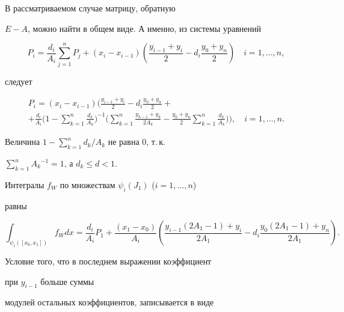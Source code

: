 \begin{pf}


В рассматриваемом случае матрицу, обратную


$E-A$, можно найти в общем виде. А именно, из системы уравнений


$$


P_i = \frac{d_i}{A_i} \sum_{j=1}^n P_j + (x_i-x_{i-1})


{\left({ \frac{y_{i-1}+y_i}{2} - d_i \frac{y_0+y_n}{2} } \right)}


\quad i=1, \dotsc , n ,


$$


следует


\begin{multline*}


P_i = (x_i-x_{i-1})


\bigg( \frac{y_{i-1}+y_i}{2} - d_i \frac{y_0+y_n}{2}  + \\


%


+ \frac{d_i}{A_i}\bigg(1 - \sum_{k=1}^n \frac{d_k}{A_k}\bigg)^{-1}


\bigg(\sum_{k=1}^n \frac{y_{k-1}+y_k}{2 A_k} -


\frac{y_0+y_n}{2} \sum_{k=1}^n {\frac{d_k}{A_k}} \bigg)


\bigg),\quad i = 1, \dotsc, n.


\end{multline*}


Величина $1 - \sum\limits_{k=1}^n {{d_k}/{A_k}} $ не равна $0$, т.\,к.


$\sum\limits_{k=1}^n {{A_k}^{-1}} = 1 $, а $d_k \le d <1$.





Интегралы $f_W$ по множествам $\psi_i (J_1)$ ($i=1, \dotsc,n$)


равны


$$


\int_{\psi_i ([x_0,x_1])} f_W dx =


\frac{d_i}{A_i} P_1 +


\frac {(x_1-x_0)}{A_i} { \left({


\frac{y_{i-1}(2A_1-1)+y_i}{2A_1} -


d_i \frac{y_0(2A_1-1)+y_n}{2A_1} } \right)}.


$$


Условие того, что в последнем выражении коэффициент


при $y_{i-1}$ больше суммы


модулей остальных коэффициентов, записывается в виде



\end{pf}
